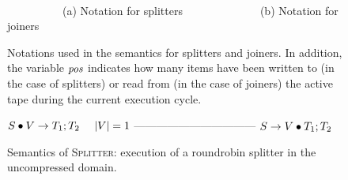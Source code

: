 \begin{figure}[t]
~~~~~~~~~

\mbox{~~~~~~~~~~}(a) Notation for splitters~~~~~~~~~~~~~~(b) Notation for joiners
\caption{Notations used in the semantics for splitters and joiners.
  In addition, the variable $\mbox{\it pos}$ indicates how many items have been
  written to (in the case of splitters) or read from (in the case of
  joiners) the active tape during the current execution cycle.
  \protect\label{fig:sj-pic}}
\end{figure}

\begin{figure}[t]
$S \bullet V \rightarrow T_1; T_2~~~~|V|=1$\skiptopb
---------------------------------\skipbot
$S \rightarrow V \bullet T_1; T_2$
\caption{Semantics of \textsc{Splitter}: execution of a roundrobin
  splitter in the uncompressed domain.
 \protect\label{fig:uncompressed-splitter}}
\end{figure}

